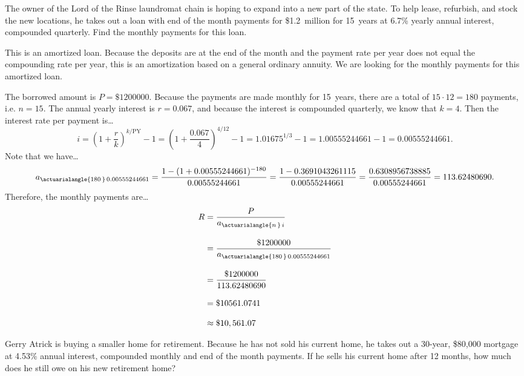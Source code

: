 \documentclass[11pt,letterpaper]{article}
\begin{document}

 The owner of the Lord of the Rinse laundromat chain is hoping to expand into a new part of the state. To help lease, refurbish, and stock the new locations, he takes out a loan with end of the month payments for \$1.2~million for 15~years at 6.7\% yearly annual interest, compounded quarterly. Find the monthly payments for this loan. \pspace

\sol This is an amortized loan. Because the deposits are at the end of the month and the payment rate per year does not equal the compounding rate per year, this is an amortization based on a general ordinary annuity. We are looking for the monthly payments for this amortized loan. \pspace

The borrowed amount is $P= \$1200000$. Because the payments are made monthly for 15~years, there are a total of $15 \cdot 12= 180$ payments, i.e. $n= 15$. The annual yearly interest is $r= 0.067$, and because the interest is compounded quarterly, we know that $k= 4$. Then the interest rate per payment is\dots
	\[
	i= \left( 1 + \dfrac{r}{k} \right)^{k/\text{PY}} - 1= \left( 1 + \dfrac{0.067}{4} \right)^{4/12} - 1= 1.01675^{1/3} - 1= 1.00555244661 - 1= 0.00555244661.
	\]
Note that we have\dots
	\[
	a_{\actuarialangle{180\,}\, 0.00555244661}= \dfrac{1 - (1 + 0.00555244661)^{-180}}{0.00555244661}= \dfrac{1 - 0.3691043261115}{0.00555244661}= \dfrac{0.6308956738885}{0.00555244661}= 113.62480690.
	\]
Therefore, the monthly payments are\dots
	\[
	\begin{aligned}
	R&= \dfrac{P}{a_{\actuarialangle{n\,}\, i}} \\[0.3cm]
	&= \dfrac{\$1200000}{a_{\actuarialangle{180\,}\, 0.00555244661}} \\[0.3cm]
	&= \dfrac{\$1200000}{113.62480690} \\[0.3cm]
	&= \$10561.0741 \\[0.3cm]
	&\approx \$10,561.07
	\end{aligned}
	\]



\newpage



 Gerry Atrick is buying a smaller home for retirement. Because he has not sold his current home, he takes out a 30-year, \$80,000 mortgage at 4.53\% annual interest, compounded monthly and end of the month payments. If he sells his current home after 12 months, how much does he still owe on his new retirement home? \pspace
\end{document}
